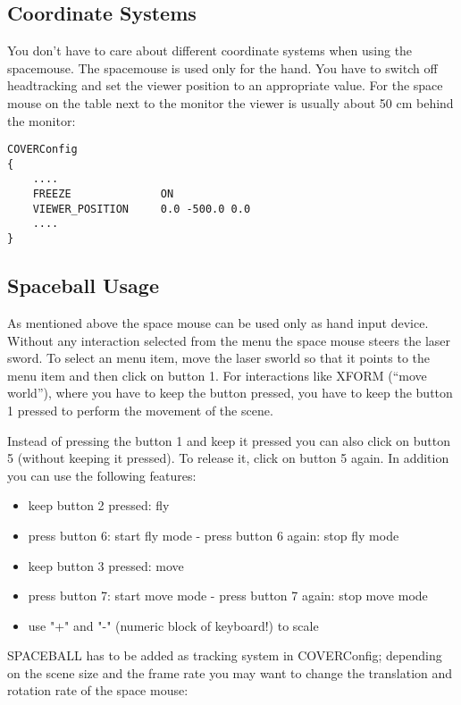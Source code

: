 \subsection{Coordinate Systems}
You don't have to care about different coordinate systems when using the
spacemouse. The spacemouse is used only for the hand. You have to switch
off headtracking and set the
viewer position to an appropriate value. For the space mouse on the table
next to the
monitor the viewer is usually about 50 cm behind the monitor:

\small \begin{verbatim}
COVERConfig
{
    ....
    FREEZE              ON
    VIEWER_POSITION     0.0 -500.0 0.0
    ....
}
\end{verbatim} \normalsize


\subsection{Spaceball Usage}

As mentioned above the space mouse can be used only as hand input device. 
Without any interaction selected from the menu the space mouse steers
the laser sword. To select an menu item, move the laser sworld so that
it points to the menu item and then click on button 1. For interactions 
like XFORM (``move world''), where you have to keep the button pressed, 
you have to keep the button 1 pressed to perform the movement of the scene. 

Instead of pressing the button 1 and keep it pressed you can also
click on button 5 (without keeping it pressed). 
To release it, click on button 5 again. 
\clearpage
In addition you can use the following features:
\begin{itemize}
\item keep button 2 pressed: fly
\item press button 6: start fly mode - press button 6 again: stop fly mode
\item keep button 3 pressed: move
\item press button 7: start move mode - press button 7 again: stop move mode
\item use "+" and "-" (numeric block of keyboard!) to scale
\end{itemize}

SPACEBALL has to be added as tracking system in COVERConfig; depending on the scene size 
and the frame rate you may want to change the translation and rotation rate of the 
space mouse:
 

